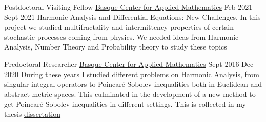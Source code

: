 \begin{employment}
    {Postdoctoral Visiting Fellow}
    { \href{http://www.bcamath.org/es/}{Basque Center for Applied Mathematics}}
    {Feb 2021}
    {Sept 2021}
    {Harmonic Analysis and Differential Equations: New Challenges. In this project we studied multifractality and intermittency properties of certain stochastic processes coming from physics. We needed ideas from Harmonic Analysis, Number Theory and Probability theory to study these topics}
\end{employment}

\begin{firstemployment}
    {Predoctoral Researcher}
    { \href{http://www.bcamath.org/es/}{Basque Center for Applied Mathematics}}
    {Sept 2016}
    {Dec 2020}
    {During these years I studied different problems on Harmonic Analysis, from singular integral operators to Poincaré-Sobolev inequalities both in Euclidean and abstract metric spaces. This culminated in the development of a new method to get Poincaré-Sobolev inequalities in different settings. This is collected in my thesis \href{https://bird.bcamath.org/handle/20.500.11824/1206}{dissertation}}
\end{firstemployment}
